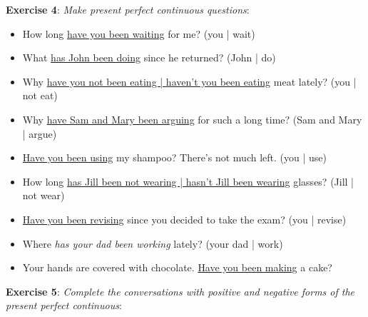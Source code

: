 \textbf{Exercise 4}: \textit{Make present perfect continuous questions}:

\begin{itemize}

\item How long \underline{have you been waiting} for me? (you | wait)
\item What \underline{has John been doing} since he returned? (John | do)
\item Why \underline{have you not been eating | haven't you been eating} meat lately? (you | not eat)
\item Why \underline{have Sam and Mary been arguing} for such a long time? (Sam and Mary | argue)
\item \underline{Have you been using} my shampoo? There's not much left. (you | use)
\item How long \underline{has Jill been not wearing | hasn't Jill been wearing} glasses? (Jill | not wear)
\item \underline{Have you been revising} since you decided to take the exam? (you | revise)
\item Where \textit{has your dad been working} lately? (your dad | work)
\item Your hands are covered with chocolate. \underline{Have you been making} a cake?

\end{itemize}

\textbf{Exercise 5}: \textit{Complete the conversations with positive and negative forms of the present perfect continuous}:

